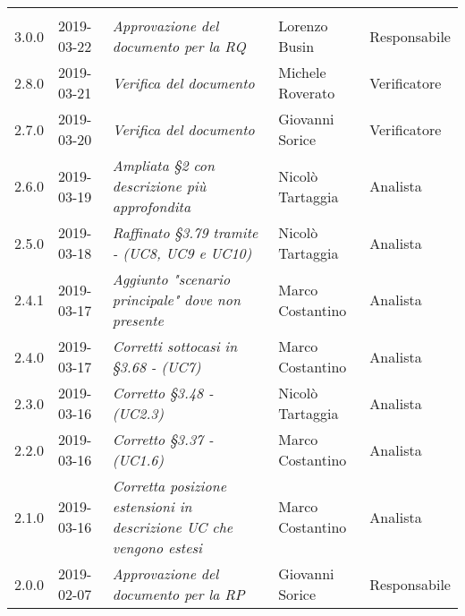 \newpage 
\section*{}
	\begin{longtable}{C{2cm}|C{2.5cm}|C{4.5cm}|C{2.5cm}|C{3cm}}

	 &  &  &  &   \\
	\endhead
	
		3.0.0 & 2019-03-22 & \emph{Approvazione del documento per la RQ} & Lorenzo Busin & Responsabile \\
		\hline
		
		2.8.0 & 2019-03-21 & \emph{Verifica del documento} & Michele Roverato & Verificatore \\
		\hline
		
		2.7.0 & 2019-03-20 & \emph{Verifica del documento} & Giovanni Sorice & Verificatore \\
		\hline
		
		2.6.0 & 2019-03-19 & \emph{Ampliata §2 con descrizione più approfondita} & Nicolò Tartaggia  & Analista \\
		\hline
	
		2.5.0 & 2019-03-18 & \emph{Raffinato §3.79 tramite - (UC8, UC9 e UC10)} & Nicolò Tartaggia  & Analista \\
		\hline
	
		2.4.1 & 2019-03-17 & \emph{Aggiunto "scenario principale" dove non presente} & Marco Costantino & Analista \\
		\hline
	
		2.4.0 & 2019-03-17 & \emph{Corretti sottocasi in §3.68 - (UC7)} & Marco Costantino & Analista \\
		\hline
	
		2.3.0 & 2019-03-16 & \emph{Corretto §3.48 - (UC2.3)} & Nicolò Tartaggia & Analista \\
		\hline
		
		2.2.0 & 2019-03-16 & \emph{Corretto §3.37 - (UC1.6)} & Marco Costantino & Analista \\
		\hline
	
	    2.1.0 & 2019-03-16 & \emph{Corretta posizione estensioni in descrizione UC che vengono estesi} & Marco Costantino & Analista \\
	    \hline
	
		2.0.0 & 2019-02-07 & \emph{Approvazione del documento per la RP} & Giovanni Sorice & Responsabile \\
		\hline
	

\end{longtable}

